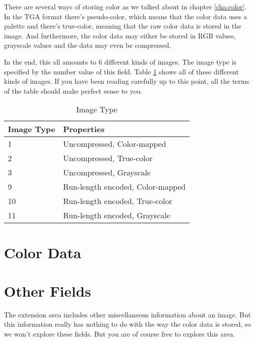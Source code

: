 \begin{refsection}

  There are several ways of storing color as we talked about in
  chapter \ref{cha:color}. In the TGA format there's
  pseudo-color, which means that the color data
  uses a palette and there's true-color, meaning that the raw
  color data is stored in the image. And furthermore, the color data
  may either be stored in RGB values, grayscale values and the data
  may even be compressed.

  In the end, this all amounts to $6$ different kinds of images. The
  image type is specified by the number value of this field. Table \ref{tab:imgtype}
  shows all of these different kinds of images. If you have been
  reading carefully up to this point, all the terms of the table
  should make perfect sense to you.

  \begin{table}
    \centering
    \begin{tabular}{ll}
      \toprule
      Image Type & Properties \\
      \midrule
      1 & Uncompressed, Color-mapped \\
      2 & Uncompressed, True-color \\
      3 & Uncompressed, Grayscale\\
      9 & Run-length encoded, Color-mapped \\
      10 & Run-length encoded, True-color \\
      11 & Run-length encoded, Grayscale\\
      \bottomrule
    \end{tabular}
    \caption{Image Type}
    \label{tab:imgtype}
  \end{table}


  \section{Color Data}

  \section{Other Fields}

  The extension area includes other miscellaneous information about an
  image. But this information really has nothing to do with the way
  the color data is stored, so we won't explore these fields. But you
  are of course free to explore this area.

  \printbibliography[heading=subbibliography]

\end{refsection}